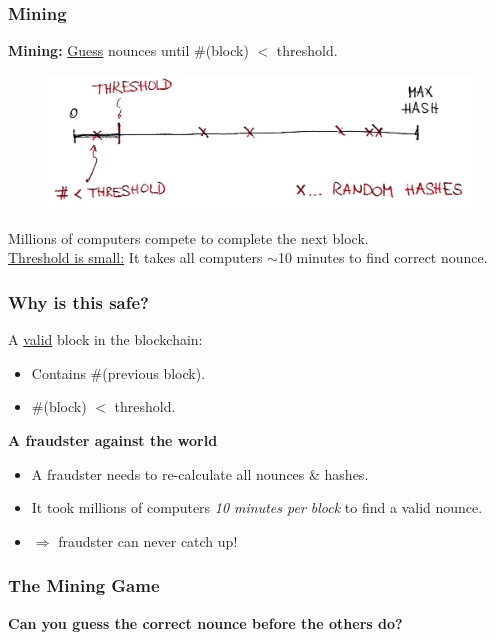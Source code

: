 \documentclass[12pt]{beamer}
\theoremstyle{definition}
\numberwithin{equation}{section}
\begin{document}
\begin{frame}
\frametitle{Mining}
\textbf{Mining:} \underline{Guess} nounces until \#(block) $<$ threshold.

\begin{figure}
\includegraphics[scale=0.25, trim = {30mm 0mm 0mm 0mm}]{fig5}
\end{figure}
Millions of computers compete to complete the next block.\\
\underline{Threshold is small:} It takes all computers $\sim$10 minutes to find correct nounce.
\end{frame}

\begin{frame}
\frametitle{Why is this safe?}
A \underline{valid} block in the blockchain:
\begin{itemize}
\item Contains \#(previous block).
\item \#(block) $<$ threshold.
\end{itemize}
\bigskip

\textbf{A fraudster against the world}
\begin{itemize}
\item A fraudster needs to re-calculate all nounces \& hashes.
\item It took millions of computers \emph{10 minutes per block} to find a valid nounce.
\item $\Rightarrow$ fraudster can never catch up!
\end{itemize}
\end{frame}

\begin{frame}
\frametitle{The Mining Game}
\textbf{Can you guess the correct nounce before the others do?}
\end{frame}
\end{document}
